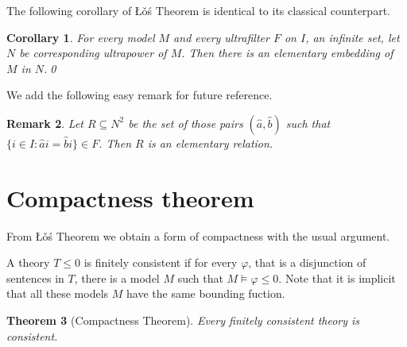 \documentclass[12pt,letterpaper,oneside,reqno]{amsart}
\theoremstyle{plain}
\newtheorem{theorem}{Theorem}%
\newtheorem{corollary}[theorem]{Corollary}
\newtheorem{remark}[theorem]{Remark}
\theoremstyle{remark}
\begin{document}
The following corollary of  \L\v{o}\'s Theorem is identical to its classical counterpart.

\begin{corollary}
  For every model $M$ and every ultrafilter $F$ on $I$, an infinite set, let $N$ be corresponding ultrapower of $M$.
  Then there is an elementary embedding of $M$ in $N$.\qed
\end{corollary}

We add the following easy remark for future reference.

\begin{remark}
  Let $R\subseteq N^2$ be the set of those pairs $(\hat a, \hat b)$ such that $\{i\in I:\hat ai=\hat bi\}\in F$.
  Then $R$ is an elementary relation.
\end{remark}

\section{Compactness theorem}\label{compactness}

\def\ceq#1#2#3{\parbox[t]{20ex}{$\displaystyle #1$}\parbox{5ex}{\hfil $#2$}{$\displaystyle #3$}}

From \L\v{o}\'s Theorem we obtain a form of compactness with the usual argument.

A theory $T\le0$ is finitely consistent if for every $\varphi$, that is a disjunction of sentences in $T$, there is a model $M$ such that $M\models \varphi\le0$.
Note that it is implicit that all these models $M$ have the same bounding fuction.

\begin{theorem}[Compactness Theorem]\label{thm_compattezza}
  Every finitely consistent theory is consistent. 
  \end{theorem}
  
\end{document}
